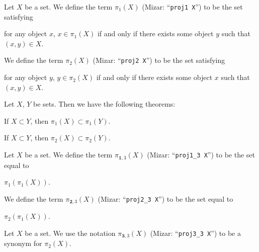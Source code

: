 \begin{definition}
  Let $X$ be a set.
  We define the term $\pi_{1}(X)$ (Mizar: ``\verb#proj1 X#'') to be the
  set satisfying
  \begin{defn}
  \item for any object $x$, $x\in\pi_{1}(X)$ if and only if there exists
    some object $y$ such that $(x,y)\in X$.
  \end{defn}
  We define the term $\pi_{2}(X)$ (Mizar: ``\verb#proj2 X#'') to be the
  set satisfying
  \begin{defn}
  \item for any object $y$, $y\in\pi_{2}(X)$ if and only if there exists
    some object $x$ such that $(x,y)\in X$.
  \end{defn}
\end{definition}

Let $X$, $Y$ be sets. Then we have the following theorems:
\begin{thm}
\item\label{xtuple0:8} If $X\subset Y$, then $\pi_{1}(X)\subset\pi_{1}(Y)$.
\item\label{xtuple0:9} If $X\subset Y$, then $\pi_{2}(X)\subset\pi_{2}(Y)$.
\end{thm}

\begin{definition}
  Let $X$ be a set.
  We define the term $\pi_{\mathbf{1},3}(X)$ (Mizar: ``\verb#proj1_3 X#'') to be the
  set equal to
  \begin{defn}
  \item $\pi_{1}(\pi_{1}(X))$.
  \end{defn}
  We define the term $\pi_{\mathbf{2},3}(X)$ (Mizar: ``\verb#proj2_3 X#'') to be the
  set equal to
  \begin{defn}
  \item $\pi_{2}(\pi_{1}(X))$.
  \end{defn}
\end{definition}

\begin{notation}
Let $X$ be a set. We use the notation $\pi_{\mathbf{3},3}(X)$ (Mizar: ``\verb#proj3_3 X#'') to be a
synonym for $\pi_{2}(X)$.
\end{notation}

